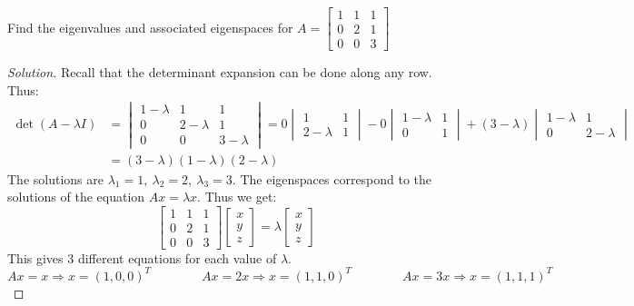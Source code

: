 \documentclass[crop=false,class=book]{standalone}
\begin{document}
\begin{problem}
Find the eigenvalues and associated eigenspaces for $A = \begin{bmatrix} 1 & 1 & 1 \\ 0 & 2 & 1 \\ 0 & 0 & 3\end{bmatrix}$
\end{problem}
\begin{proof}[Solution]
Recall that the determinant expansion can be done along any row. Thus:
\begin{align*}
    \det(A-\lambda I) &= \begin{vmatrix} 1-\lambda & 1 & 1 \\ 0 & 2-\lambda & 1 \\ 0 & 0 & 3-\lambda \end{vmatrix}=0\begin{vmatrix} 1 & 1 \\ 2-\lambda & 1 \end{vmatrix}-0 \begin{vmatrix} 1-\lambda & 1 \\ 0 & 1 \end{vmatrix} + (3-\lambda)\begin{vmatrix} 1-\lambda & 1 \\ 0 & 2-\lambda\end{vmatrix}\\
    &= (3-\lambda)(1-\lambda)(2-\lambda)    
\end{align*}
The solutions are $\lambda_1 = 1,\ \lambda_2 = 2,\ \lambda_3 = 3$. The eigenspaces correspond to the solutions of the equation $Ax = \lambda x$. Thus we get:
\begin{equation*}
    \begin{bmatrix} 1 & 1 & 1 \\ 0 & 2 & 1 \\ 0 & 0 & 3 \end{bmatrix}\begin{bmatrix} x \\ y \\ z \end{bmatrix} = \lambda \begin{bmatrix}x \\ y \\ z\end{bmatrix}    
\end{equation*}
This gives 3 different equations for each value of $\lambda$.
\begin{equation*}
    Ax=x\Rightarrow x=(1,0,0)^{T}\quad\quad\quad\quad Ax=2x\Rightarrow x=(1,1,0)^{T}\quad\quad\quad\quad Ax=3x\Rightarrow x=(1,1,1)^{T}
\end{equation*}
\end{proof}
\end{document}
